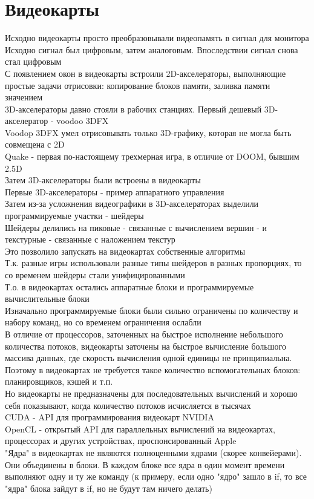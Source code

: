 \documentclass[12pt]{article}
\begin{document}
\section{Видеокарты}
Исходно видеокарты просто преобразовывали видеопамять в сигнал для монитора\\
Исходно сигнал был цифровым, затем аналоговым. Впоследствии сигнал снова стал цифровым\\
С появлением окон в видеокарты встроили 2D-акселераторы, выполняющие простые задачи отрисовки: копирование блоков памяти, заливка памяти значением\\
3D-акселераторы давно стояли в рабочих станциях. Первый дешевый 3D-акселератор - voodoo 3DFX\\
Voodop 3DFX умел отрисовывать только 3D-графику, которая не могла быть совмещена с 2D\\
Quake - первая по-настоящему трехмерная игра, в отличие от DOOM, бывшим 2.5D\\
Затем 3D-акселераторы были встроены в видеокарты\\
Первые 3D-акселераторы - пример аппаратного управления\\
Затем из-за усложнения видеографики в 3D-акселераторах выделили программируемые участки - шейдеры\\
Шейдеры делились на пиковые - связанные с вычислением вершин - и текстурные - связанные с наложением текстур\\
Это позволило запускать на видеокартах собственные алгоритмы\\
Т.к. разные игры использовали разные типы шейдеров в разных пропорциях, то со временем шейдеры стали унифицированными\\
Т.о. в видеокартах остались аппаратные блоки и программируемые вычислительные блоки\\
Изначально программируемые блоки были сильно ограничены по количеству и набору команд, но со временем ограничения ослабли\\
В отличие от процессоров, заточенных на быстрое исполнение небольшого количества потоков, видеокарты заточены на быстрое вычисление большого массива данных, где скорость вычисления одной единицы не принципиальна. Поэтому в видеокартах не требуется такое количество вспомогательных блоков: планировщиков, кэшей и т.п.\\
Но видеокарты не предназначены для последовательных вычислений и хорошо себя показывают, когда количество потоков исчисляется в тысячах\\
CUDA - API для программирования видеокарт NVIDIA\\
OpenCL - открытый API для параллельных вычислений на видеокартах, процессорах и других устройствах, проспонсированный Apple\\
"Ядра" в видеокартах не являются полноценными ядрами (скорее конвейерами). Они объединены в блоки. В каждом блоке все ядра в один момент времени выполняют одну и ту же команду (к примеру, если одно "ядро" зашло в if, то все "ядра" блока зайдут в if, но не будут там ничего делать)\\
\end{document}
